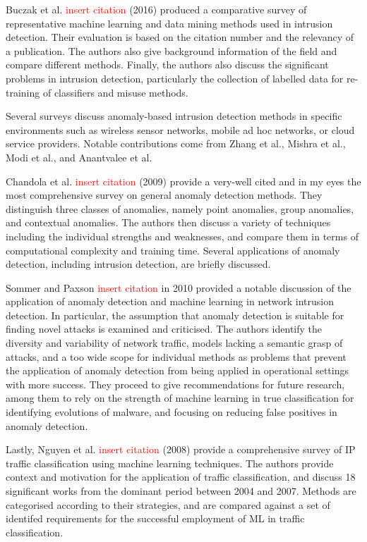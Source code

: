\documentclass[a4paper,12pt,twoside]{report}
\begin{document}
Buczak et al. \textcolor{red}{insert citation} (2016) produced a comparative survey of representative machine learning and data mining methods used in intrusion detection.  Their evaluation is based on the citation number and  the  relevancy of a publication.  The authors also give background information of the field and compare different methods. Finally, the authors also discuss the  significant  problems  in intrusion detection, particularly the collection of labelled data for re-training of classifiers and misuse methods.

Several surveys discuss anomaly-based intrusion detection methods in specific environments such as wireless sensor networks, mobile ad hoc networks, or cloud service providers. Notable contributions come from Zhang et al., Mishra et al., Modi et al., and Anantvalee et al.

Chandola et al.  \textcolor{red}{insert citation} (2009) provide a very-well cited and in my eyes the most comprehensive survey on general anomaly detection methods. They distinguish three classes of anomalies, namely point anomalies, group anomalies, and contextual anomalies. The authors then discuss a variety of techniques including the individual strengths and weaknesses, and compare them in terms of computational complexity and training time. Several applications of anomaly detection, including intrusion detection, are briefly discussed. 

Sommer and Paxson \textcolor{red}{insert citation} in 2010 provided a notable discussion of the application of anomaly detection and machine learning in network intrusion detection. In particular, the assumption that anomaly detection is suitable for finding novel attacks is examined and criticised. The authors identify the diversity and variability of network traffic, models lacking a semantic grasp of attacks, and a too wide scope for individual methods as problems that prevent the application of anomaly detection from being applied in operational settings with more success. They proceed to give recommendations for future research, among them to rely on the strength of machine learning in true classification for identifying evolutions of malware, and focusing on reducing false positives in anomaly detection.

Lastly, Nguyen et al. \textcolor{red}{insert citation} (2008) provide a comprehensive survey of IP traffic classification using machine learning techniques. The authors provide  context  and motivation  for the  application of  traffic  classification, and discuss 18 significant works from the dominant period between 2004 and 2007. Methods are categorised according to their strategies, and are compared against a set of identifed requirements for the successful employment of ML in traffic classification. 
\end{document}
